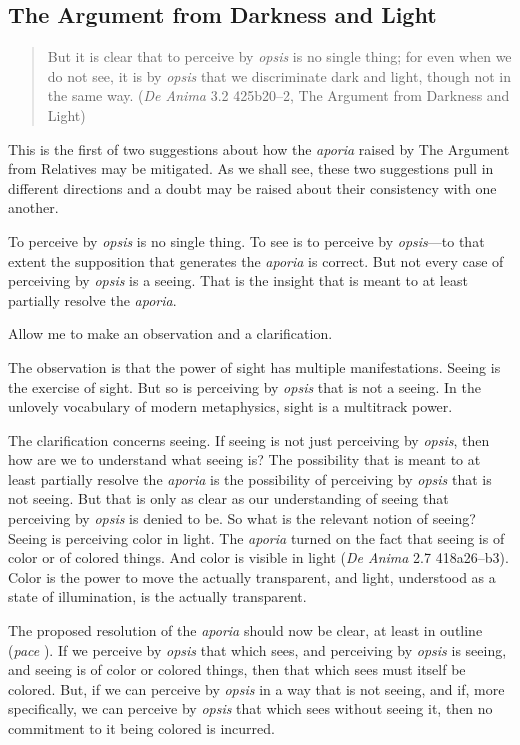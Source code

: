 
\subsection{The Argument from Darkness and Light} %
\label{sub:the_argument_from_darkness}

\begin{quote}
	But it is clear that to perceive by \emph{opsis} is no single thing; for even when we do not see, it is by \emph{opsis} that we discriminate dark and light, though not in the same way. (\emph{De Anima} 3.2 425b20–2, The Argument from Darkness and Light)
\end{quote}

This is the first of two suggestions about how the \emph{aporia} raised by The Argument from Relatives may be mitigated. As we shall see, these two suggestions pull in different directions and a doubt may be raised about their consistency with one another.

To perceive by \emph{opsis} is no single thing. To see is to perceive by \emph{opsis}—to that extent the supposition that generates the \emph{aporia} is correct. But not every case of perceiving by \emph{opsis} is a seeing. That is the insight that is meant to at least partially resolve the \emph{aporia}.

Allow me to make an observation and a clarification.

The observation is that the power of sight has multiple manifestations. Seeing is the exercise of sight. But so is perceiving by \emph{opsis} that is not a seeing. In the unlovely vocabulary of modern metaphysics, sight is a multitrack power. 

The clarification concerns seeing. If seeing is not just perceiving by \emph{opsis}, then how are we to understand what seeing is? The possibility that is meant to at least partially resolve the \emph{aporia} is the possibility of perceiving by \emph{opsis} that is not seeing. But that is only as clear as our understanding of seeing that perceiving by \emph{opsis} is denied to be. So what is the relevant notion of seeing? Seeing is perceiving color in light. The \emph{aporia} turned on the fact that seeing is of color or of colored things. And color is visible in light (\emph{De Anima} 2.7 418a26–b3). Color is the power to move the actually transparent, and light, understood as a state of illumination, is the actually transparent.

The proposed resolution of the \emph{aporia} should now be clear, at least in outline (\emph{pace} \citealt[122]{Hamlyn:2002ys}). If we perceive by \emph{opsis} that which sees, and perceiving by \emph{opsis} is seeing, and seeing is of color or colored things, then that which sees must itself be colored. But, if we can perceive by \emph{opsis} in a way that is not seeing, and if, more specifically, we can perceive by \emph{opsis} that which sees without seeing it, then no commitment to it being colored is incurred.

